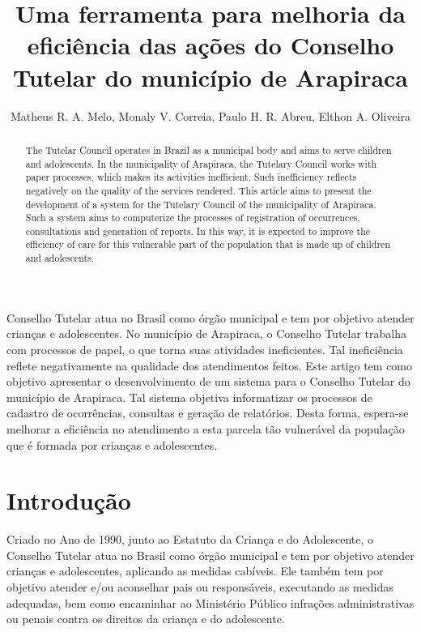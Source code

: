 \documentclass[12pt]{article}
\author{Matheus R. A. Melo\inst{1}, Monaly V. Correia\inst{1}, Paulo H. R. Abreu\inst{1}, Elthon A. Oliveira\inst{1}}
\title{Uma ferramenta para melhoria da eficiência das ações do Conselho Tutelar do município de Arapiraca}
\begin{document}
 

\maketitle

\begin{abstract}
The Tutelar Council operates in Brazil as a municipal body and aims to serve children and adolescents. In the municipality of Arapiraca, the Tutelary Council works with paper processes, which makes its activities inefficient. Such inefficiency reflects negatively on the quality of the services rendered. This article aims to present the development of a system for the Tutelary Council of the municipality of Arapiraca. Such a system aims to computerize the processes of registration of occurrences, consultations and generation of reports. In this way, it is expected to improve the efficiency of care for this vulnerable part of the population that is made up of children and adolescents.
\end{abstract}
     
\begin{resumo}
Conselho Tutelar atua no Brasil como órgão municipal e tem por objetivo atender crianças e adolescentes. No município de Arapiraca, o Conselho Tutelar trabalha com processos de papel, o que torna suas atividades ineficientes. Tal ineficiência reflete negativamente na qualidade dos atendimentos feitos. Este artigo tem como objetivo apresentar o desenvolvimento de um sistema para o Conselho Tutelar do município de Arapiraca. Tal sistema objetiva informatizar os processos de cadastro de ocorrências, consultas e geração de relatórios. Desta forma, espera-se melhorar a eficiência no atendimento a esta parcela tão vulnerável da população que é formada por crianças e adolescentes.
\end{resumo}


\section{Introdução}
Criado no Ano de 1990, junto ao Estatuto da Criança e do Adolescente, o Conselho Tutelar atua no Brasil como órgão municipal e tem por objetivo atender crianças e adolescentes, aplicando as medidas cabíveis. Ele também tem por objetivo atender e/ou aconselhar pais ou responsáveis, executando as medidas adequadas, bem como encaminhar ao Ministério Público infrações administrativas ou penais contra os direitos da criança e do adolescente. 
\end{document}
